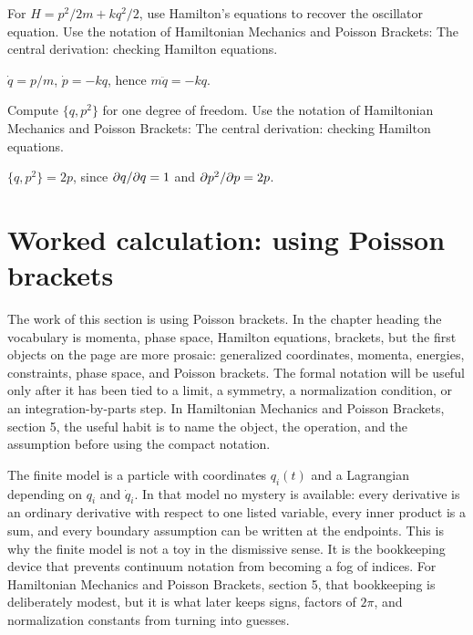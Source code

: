 \begin{exercise}
For \(H=p^2/2m+kq^2/2\), use Hamilton's equations to recover the oscillator equation.  Use the notation of Hamiltonian Mechanics and Poisson Brackets: The central derivation: checking Hamilton equations.
\begin{answer}
\(\dot q=p/m\), \(\dot p=-kq\), hence \(m\ddot q=-kq\).
\end{answer}
\end{exercise}

\begin{exercise}
Compute \(\{q,p^2\}\) for one degree of freedom.  Use the notation of Hamiltonian Mechanics and Poisson Brackets: The central derivation: checking Hamilton equations.
\begin{answer}
\(\{q,p^2\}=2p\), since \(\partial q/\partial q=1\) and \(\partial p^2/\partial p=2p\).
\end{answer}
\end{exercise}



\section{Worked calculation: using Poisson brackets}

The work of this section is using Poisson brackets.  In the chapter heading the vocabulary is momenta, phase space, Hamilton equations, brackets, but the first objects on the page are more prosaic: generalized coordinates, momenta, energies, constraints, phase space, and Poisson brackets.  The formal notation will be useful only after it has been tied to a limit, a symmetry, a normalization condition, or an integration-by-parts step.  In Hamiltonian Mechanics and Poisson Brackets, section 5, the useful habit is to name the object, the operation, and the assumption before using the compact notation.

The finite model is a particle with coordinates \(q_i(t)\) and a Lagrangian depending on \(q_i\) and \(\dot q_i\).  In that model no mystery is available: every derivative is an ordinary derivative with respect to one listed variable, every inner product is a sum, and every boundary assumption can be written at the endpoints.  This is why the finite model is not a toy in the dismissive sense.  It is the bookkeeping device that prevents continuum notation from becoming a fog of indices.  For Hamiltonian Mechanics and Poisson Brackets, section 5, that bookkeeping is deliberately modest, but it is what later keeps signs, factors of \(2\pi\), and normalization constants from turning into guesses.


